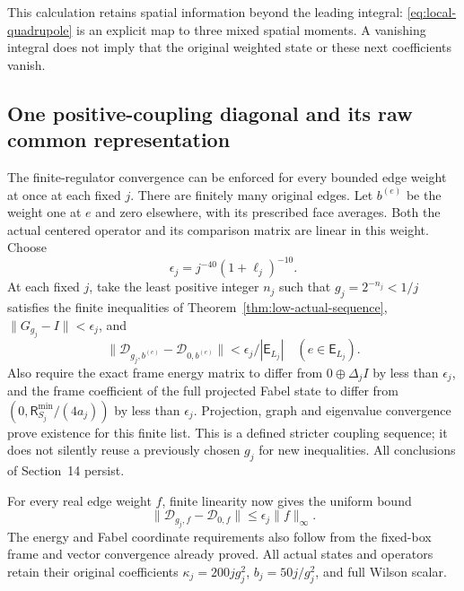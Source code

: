 This calculation retains spatial information beyond the leading
integral: \eqref{eq:local-quadrupole} is an explicit map to three
mixed spatial moments. A vanishing integral does not imply that
the original weighted state or these next coefficients vanish.

\subsection{One positive-coupling diagonal and its raw common representation}

The finite-regulator convergence can be enforced for every bounded
edge weight at once at each fixed $j$. There are finitely many
original edges. Let $b^{(e)}$ be the weight one at $e$ and zero
elsewhere, with its prescribed face averages. Both the actual
centered operator and its comparison matrix are linear in this
weight. Choose
\[
 \epsilon_j=j^{-40}(1+\ell_j)^{-10}.
\]
At each fixed $j$, take the least positive integer $n_j$ such that
$g_j=2^{-n_j}<1/j$ satisfies the finite inequalities of
Theorem~\ref{thm:low-actual-sequence}, $\|G_{g_j}-I\|<\epsilon_j$,
and
\[
 \|\mathcal D_{g_j,b^{(e)}}-\mathcal D_{0,b^{(e)}}\|
       <\epsilon_j/|\mathsf E_{L_j}|\quad(e\in\mathsf E_{L_j}).
\]
Also require the exact frame energy matrix to differ from
$0\oplus\Delta_jI$ by less than $\epsilon_j$, and the frame
coefficient of the full projected Fabel state to differ from
$(0,\mathsf R_{S_j}^{\min}/(4a_j))$ by less than $\epsilon_j$.
Projection, graph and eigenvalue convergence prove existence for
this finite list. This is a defined stricter coupling sequence;
it does not silently reuse a previously chosen $g_j$ for new
inequalities. All conclusions of Section~14 persist.

For every real edge weight $f$, finite linearity now gives the
uniform bound
\[
 \|\mathcal D_{g_j,f}-\mathcal D_{0,f}\|
 \le\epsilon_j\|f\|_\infty.
\]
The energy and Fabel coordinate requirements also follow from the
fixed-box frame and vector convergence already proved.
All actual states and operators retain their original coefficients
$\kappa_j=200jg_j^2$, $b_j=50j/g_j^2$, and full Wilson scalar.

